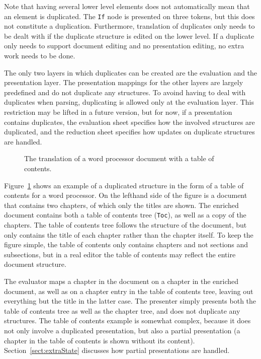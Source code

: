 Note that having several lower level elements does not automatically mean that an element is duplicated. The  \verb|If| node is presented on three tokens, but this does not constitute a duplication. Furthermore, translation of duplicates only needs to be dealt with if the duplicate structure is edited on the lower level. If a duplicate only needs to support document editing and no presentation editing, no extra work needs to be done.

The only two layers in which duplicates can be created are the evaluation and the presentation layer. The presentation mappings for the other layers are largely predefined and do not duplicate any structures. To avoind having to deal with duplicates when parsing, duplicating is allowed only at the evaluation layer. This restriction may be lifted in a future version, but for now, if a presentation contains duplicates, the evaluation sheet specifies how the involved structures are duplicated, and the reduction sheet specifies how updates on duplicate structures are handled.

\begin{figure}
\begin{center}
\begin{center}
%
%
\end{center}
\caption{The translation of a word processor document with a table of contents.}\label{translateExample} 
\end{center}
\end{figure}

Figure~\ref{translateExample} shows an example of a duplicated structure in the form of a table of contents for a word processor. On the lefthand side of the figure is a document that contains two chapters, of which only the titles are shown. The enriched document contains both a table of contents tree (\verb|Toc|), as well as a copy of the chapters. The table of contents tree follows the structure of the document, but only contains the title of each chapter rather than the chapter itself. To keep the figure simple, the table of contents only contains chapters and not sections and subsections, but in a real editor the table of contents may reflect the entire document structure. 

The evaluator maps a chapter in the document on a chapter in the enriched document, as well as on a chapter entry in the table of contents tree, leaving out everything but the title in the latter case. The presenter simply presents both the table of contents tree as well as the chapter tree, and does not duplicate any structures. The table of contents example is somewhat complex, because it does not only involve a duplicated presentation, but also a partial presentation (a chapter in the table of contents is shown without its content). Section~\ref{sect:extraState} discusses how partial presentations are handled.

